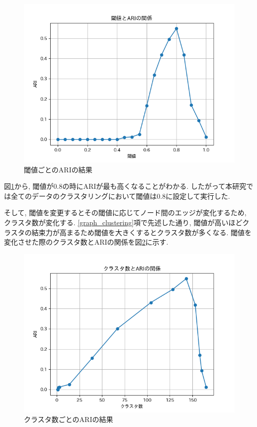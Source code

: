 \begin{figure}[H]
  \centering
  \includegraphics[scale=0.8]
    {contents/images/cw_graph.png}
  \caption{閾値ごとのARIの結果\label{fig:cw_graph}}
\end{figure}
図\ref{fig:cw_graph}から, 閾値が0.8の時にARIが最も高くなることがわかる. したがって本研究では全てのデータのクラスタリングにおいて閾値は0.8に設定して実行した.

そして, 閾値を変更するとその閾値に応じてノード間のエッジが変化するため, クラスタ数が変化する. \ref{graph_clustering}項で先述した通り, 閾値が高いほどクラスタの結束力が高まるため閾値を大きくするとクラスタ数が多くなる. 閾値を変化させた際のクラスタ数とARIの関係を図\ref{fig:cw_cluster_graph}に示す.

\begin{figure}[H]
  \centering
  \includegraphics[scale=0.8]
    {contents/images/cw_cluster_graph.png}
  \caption{クラスタ数ごとのARIの結果\label{fig:cw_cluster_graph}}
\end{figure}

